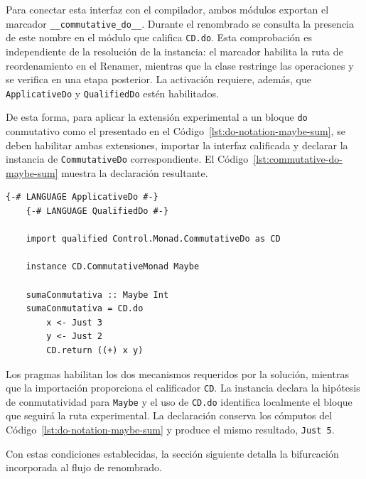 Para conectar esta interfaz con el compilador, ambos módulos exportan el marcador \texttt{\_\_commutative\_do\_\_}. Durante el renombrado se consulta la presencia de este nombre en el módulo que califica \texttt{CD.do}. Esta comprobación es independiente de la resolución de la instancia: el marcador habilita la ruta de reordenamiento en el Renamer, mientras que la clase restringe las operaciones y se verifica en una etapa posterior. La activación requiere, además, que \texttt{ApplicativeDo} y \texttt{QualifiedDo} estén habilitados.

De esta forma, para aplicar la extensión experimental a un bloque \texttt{do} conmutativo como el presentado en el Código~\ref{lst:do-notation-maybe-sum}, se deben habilitar ambas extensiones, importar la interfaz calificada y declarar la instancia de \texttt{CommutativeDo} correspondiente. El Código~\ref{lst:commutative-do-maybe-sum} muestra la declaración resultante.

\noindent\begin{minipage}{\textwidth}
\begin{lstlisting}[style=haskell,caption={Uso de la extensión experimental \texttt{CommutativeDo} sobre una suma monádica con \texttt{Maybe Int}.},label={lst:commutative-do-maybe-sum}]
    {-# LANGUAGE ApplicativeDo #-}
    {-# LANGUAGE QualifiedDo #-}

    import qualified Control.Monad.CommutativeDo as CD

    instance CD.CommutativeMonad Maybe

    sumaConmutativa :: Maybe Int
    sumaConmutativa = CD.do
        x <- Just 3
        y <- Just 2
        CD.return ((+) x y)    
\end{lstlisting}
\end{minipage}

Los pragmas habilitan los dos mecanismos requeridos por la solución, mientras que la importación proporciona el calificador \texttt{CD}. La instancia declara la hipótesis de conmutatividad para \texttt{Maybe} y el uso de \texttt{CD.do} identifica localmente el bloque que seguirá la ruta experimental. La declaración conserva los cómputos del Código~\ref{lst:do-notation-maybe-sum} y produce el mismo resultado, \texttt{Just 5}.

Con estas condiciones establecidas, la sección siguiente detalla la bifurcación incorporada al flujo de renombrado.
